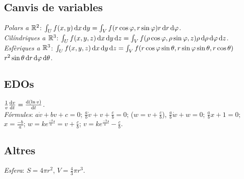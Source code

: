 \subsection{Canvis de variables}
\emph{Polars a $\mathbb{R}^2$}: $\int_U f( x,y ) \dif x\dif y = \int_V f( r\cos\varphi, r\sin\varphi )r \dif r\dif \varphi$. \\
\emph{Cilíndriques a $\mathbb{R}^3$}: $\int_U f( x,y,z ) \dif x\dif y\dif z = \int_V f( \rho\cos\varphi, \rho\sin\varphi, z )\rho \dif \rho\dif \varphi\dif z$. \\
\emph{Esfèriques a $\mathbb{R}^3$}: $\int_U f( x,y,z ) \dif x\dif y\dif z = \int_V f ( r\cos\varphi\sin\theta, r\sin\varphi\sin\theta, r\cos\theta )$ $r^2\sin\theta \dif r\dif \varphi\dif \theta$.

\subsection{EDOs}
\ci $\frac{1}{v}\frac{\dif v}{\dif t} = \frac{\dif\, (\ln v)}{\dif t}$. \\
\emph{Fórmules}: $a\dot{v}+bv+c=0$; $\frac{a}{b}\dot{v}+v+\frac{c}{b}=0$; ($w=v+\frac{c}{b}$), $\frac{a}{b}\dot{w}+w=0$; $\frac{a}{b}x+1=0$; $x=\frac{-b}{a}$; $w=k e^{\frac{-b}{a}t}=v+\frac{c}{b}$; $v=ke^{\frac{-b}{a}t}-\frac{c}{b}$.

\subsection{Altres}
\emph{Esfera}: $S=4\pi r^2$, $V=\frac{4}{3}\pi r^3$.

